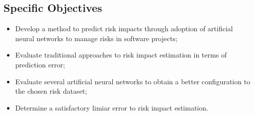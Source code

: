 \subsection{Specific Objectives}

\begin{itemize}
\item Develop a method to predict risk impacts through adoption of artificial neural networks to manage risks in software projects;
\item Evaluate traditional approaches to risk impact estimation in terms of prediction error;
\item Evaluate several artificial neural networks to obtain a better configuration to the chosen risk dataset;
\item Determine a satisfactory limiar error to risk impact estimation.
\end{itemize}

